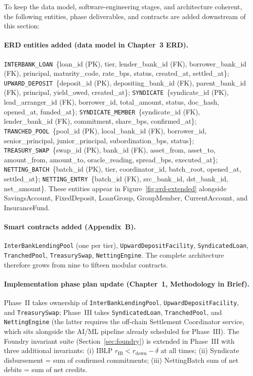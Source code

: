 \documentclass[12pt,a4paper]{report}
\begin{document}
To keep the data model, software-engineering stages, and architecture coherent, the following entities, phase deliverables, and contracts are added downstream of this section:

\paragraph{ERD entities added (data model in Chapter~3 ERD).}
\texttt{INTERBANK\_LOAN}~\{loan\_id (PK), tier, lender\_bank\_id (FK), borrower\_bank\_id (FK), principal, maturity\_code, rate\_bps, status, created\_at, settled\_at\}; \texttt{UPWARD\_DEPOSIT}~\{deposit\_id (PK), depositing\_bank\_id (FK), parent\_bank\_id (FK), principal, yield\_owed, created\_at\}; \texttt{SYNDICATE}~\{syndicate\_id (PK), lead\_arranger\_id (FK), borrower\_id, total\_amount, status, doc\_hash, opened\_at, funded\_at\}; \texttt{SYNDICATE\_MEMBER}~\{syndicate\_id (FK), lender\_bank\_id (FK), commitment, share\_bps, confirmed\_at\}; \texttt{TRANCHED\_POOL}~\{pool\_id (PK), local\_bank\_id (FK), borrower\_id, senior\_principal, junior\_principal, subordination\_bps, status\}; \texttt{TREASURY\_SWAP}~\{swap\_id (PK), bank\_id (FK), asset\_from, asset\_to, amount\_from, amount\_to, oracle\_reading, spread\_bps, executed\_at\}; \texttt{NETTING\_BATCH}~\{batch\_id (PK), tier, coordinator\_id, batch\_root, opened\_at, settled\_at\}; \texttt{NETTING\_ENTRY}~\{batch\_id (FK), src\_bank\_id, dst\_bank\_id, net\_amount\}. These entities appear in Figure~\ref{fig:erd-extended} alongside SavingsAccount, FixedDeposit, LoanGroup, GroupMember, CurrentAccount, and InsuranceFund.

\paragraph{Smart contracts added (Appendix~B).}
\texttt{InterBankLendingPool} (one per tier), \texttt{UpwardDepositFacility}, \texttt{SyndicatedLoan}, \texttt{TranchedPool}, \texttt{TreasurySwap}, \texttt{NettingEngine}. The complete architecture therefore grows from nine to fifteen modular contracts.

\paragraph{Implementation phase plan update (Chapter~1, Methodology in Brief).}
Phase~II takes ownership of \texttt{InterBankLendingPool}, \texttt{UpwardDepositFacility}, and \texttt{TreasurySwap}; Phase~III takes \texttt{SyndicatedLoan}, \texttt{TranchedPool}, and \texttt{NettingEngine} (the latter requires the off-chain Settlement Coordinator service, which sits alongside the AI/ML pipeline already scheduled for Phase~III). The Foundry invariant suite (Section~\ref{sec:foundry}) is extended in Phase~III with three additional invariants: (i) IBLP $r_{\text{IB}} < r_{\text{down}} - \delta$ at all times; (ii) Syndicate disbursement = sum of confirmed commitments; (iii) NettingBatch sum of net debits = sum of net credits.
\end{document}
